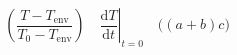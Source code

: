 \[
    \left( \frac{T - T_{\mathrm{env}}}{T_0 - T_{\mathrm{env}}} \right)
    \quad
    \left. \frac{\mathrm{d}T}{\mathrm{d}t} \right|_{t=0}
    \quad
    \bigl( (a + b) c \bigr)
\]
